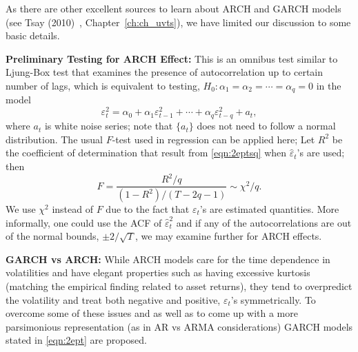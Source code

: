 As there are other excellent sources to learn about ARCH and GARCH models (see Tsay (2010)~\cite{tsay}, Chapter~\ref{ch:ch_uvts}), we have limited our discussion to some basic details. \twomedskip


\noindent\textbf{Preliminary Testing for ARCH Effect:} This is an omnibus test similar to Ljung-Box test that examines the presence of autocorrelation up to certain number of lags, which is equivalent to testing, $H_0: \alpha_1 = \alpha_2= \cdots = \alpha_q = 0$ in the model
	\begin{equation} \label{eqn:2eptsq}
	\varepsilon_t^2 = \alpha_0 + \alpha_1 \varepsilon_{t-1}^2 + \cdots + \alpha_q \varepsilon_{t-q}^2 + a_t,
	\end{equation}
where $a_t$ is white noise series; note that $\{ a_t \}$ does not need to follow a normal distribution. The usual $F$-test used in regression can be applied here; Let $R^2$ be the coefficient of determination that result from \eqref{eqn:2eptsq} when $\hat{\varepsilon}_t$'s are used; then
	\begin{equation} \label{eqn:2F}
	F = \frac{R^2/q}{(1 - R^2)/(T - 2q - 1)} \sim \chi^2/q.
	\end{equation}
We use $\chi^2$ instead of $F$ due to the fact that $\varepsilon_t$'s are estimated quantities. More informally, one could use the ACF of $\hat{\varepsilon}_t^2$ and if any of the autocorrelations are out of the normal bounds, $\pm 2/\sqrt{T}$, we may examine further for ARCH effects. \twomedskip


\noindent\textbf{GARCH vs ARCH:} While ARCH models care for the time dependence in volatilities and have elegant properties such as having excessive kurtosis (matching the empirical finding related to asset returns), they tend to overpredict the volatility and treat both negative and positive, $\varepsilon_t$'s symmetrically. To overcome some of these issues and as well as to come up with a more parsimonious representation (as in AR vs ARMA considerations) GARCH models stated in \eqref{eqn:2ept} are proposed. \twomedskip


